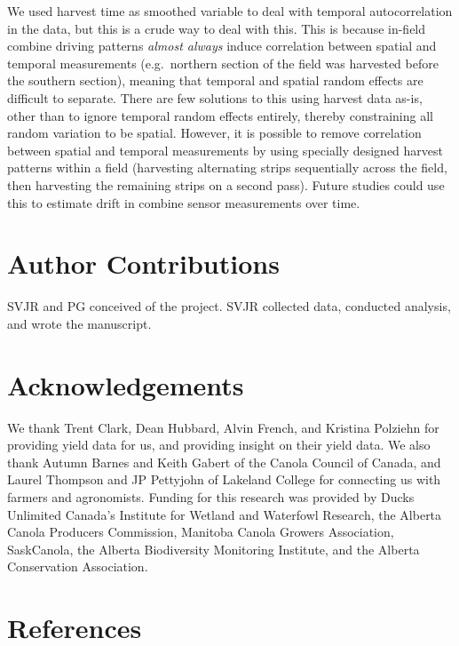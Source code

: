 \documentclass[]{elsarticle} %
\begin{document}
We used harvest time as smoothed variable to deal with temporal autocorrelation in the data, but this is a crude way to deal with this.
This is because in-field combine driving patterns \emph{almost always} induce correlation between spatial and temporal measurements (e.g.~northern section of the field was harvested before the southern section), meaning that temporal and spatial random effects are difficult to separate.
There are few solutions to this using harvest data as-is, other than to ignore temporal random effects entirely, thereby constraining all random variation to be spatial.
However, it is possible to remove correlation between spatial and temporal measurements by using specially designed harvest patterns within a field (harvesting alternating strips sequentially across the field, then harvesting the remaining strips on a second pass).
Future studies could use this to estimate drift in combine sensor measurements over time.

\hypertarget{author-contributions}{%
\section{Author Contributions}\label{author-contributions}}

SVJR and PG conceived of the project.
SVJR collected data, conducted analysis, and wrote the manuscript.

\hypertarget{acknowledgements}{%
\section{Acknowledgements}\label{acknowledgements}}

We thank Trent Clark, Dean Hubbard, Alvin French, and Kristina Polziehn for providing yield data for us, and providing insight on their yield data.
We also thank Autumn Barnes and Keith Gabert of the Canola Council of Canada, and Laurel Thompson and JP Pettyjohn of Lakeland College for connecting us with farmers and agronomists.
Funding for this research was provided by Ducks Unlimited Canada's Institute for Wetland and Waterfowl Research, the Alberta Canola Producers Commission, Manitoba Canola Growers Association, SaskCanola, the Alberta Biodiversity Monitoring Institute, and the Alberta Conservation Association.

\hypertarget{references}{%
\section*{References}\label{references}}
\end{document}
